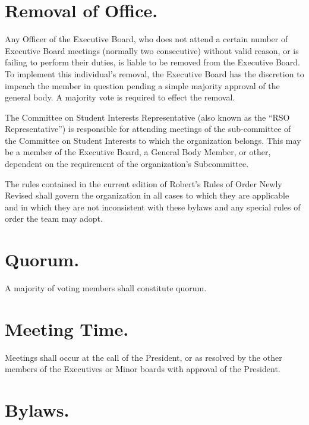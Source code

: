 \documentclass[12pt]{constitution}
\begin{document}
\section{Removal of Office.}\label{sec:REMOVAL-OF-OFFICE}

Any Officer of the Executive Board, who does not attend a certain number
of Executive Board meetings (normally two consecutive) without valid reason, or
is failing to perform their duties, is liable to be removed from the Executive
Board. To implement this individual's removal, the Executive Board has the
discretion to impeach the member in question pending a simple majority approval
of the general body. A majority vote is required to effect the removal.

\label{art:COMMITTEE-ON-STUDENT-INTERESTS-REPRESENTATIVE}

The Committee on Student Interests Representative (also known as the ``RSO
Representative'') is responsible for attending meetings of the sub-committee of
the Committee on Student Interests to which the organization belongs. This may
be a member of the Executive Board, a General Body Member, or other, dependent
on the requirement of the organization’s Subcommittee.

\label{art:PARLIAMENTARY-AUTHORITY}

The rules contained in the current edition of Robert's Rules of Order Newly
Revised shall govern the organization in all cases to which they are applicable
and in which they are not inconsistent with these bylaws and any special rules
of order the team may adopt.

\label{art:MEETINGS}

\section{Quorum.}\label{sec:QUORUM}

A majority of voting members shall constitute quorum.

\section{Meeting Time.}\label{sec:MEETING-TIME}

Meetings shall occur at the call of the President, or as resolved by the other
members of the Executives or Minor boards with approval of the President.

\section{Bylaws.}\label{sec:BYLAWS}
\end{document}
